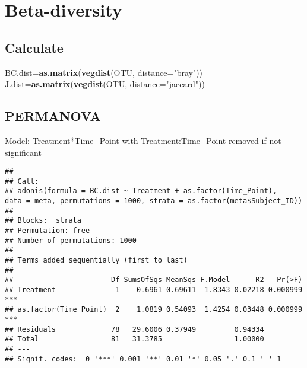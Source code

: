 \documentclass[]{article}
\newenvironment{Shaded}{\begin{snugshade}}{\end{snugshade}}
\newcommand{\KeywordTok}[1]{\textcolor[rgb]{0.13,0.29,0.53}{\textbf{#1}}}
\newcommand{\DataTypeTok}[1]{\textcolor[rgb]{0.13,0.29,0.53}{#1}}
\newcommand{\DecValTok}[1]{\textcolor[rgb]{0.00,0.00,0.81}{#1}}
\newcommand{\StringTok}[1]{\textcolor[rgb]{0.31,0.60,0.02}{#1}}
\newcommand{\OperatorTok}[1]{\textcolor[rgb]{0.81,0.36,0.00}{\textbf{#1}}}
\newcommand{\NormalTok}[1]{#1}
\begin{document}
\section{Beta-diversity}\label{beta-diversity}

\subsection{Calculate}\label{calculate}

\begin{Shaded}
\begin{Highlighting}[]
\NormalTok{BC.dist=}\KeywordTok{as.matrix}\NormalTok{(}\KeywordTok{vegdist}\NormalTok{(OTU, }\DataTypeTok{distance=}\StringTok{"bray"}\NormalTok{))}
\NormalTok{J.dist=}\KeywordTok{as.matrix}\NormalTok{(}\KeywordTok{vegdist}\NormalTok{(OTU, }\DataTypeTok{distance=}\StringTok{"jaccard"}\NormalTok{))}
\end{Highlighting}
\end{Shaded}

\subsection{PERMANOVA}\label{permanova}

Model: Treatment*Time\_Point with Treatment:Time\_Point removed if not
significant

\begin{Shaded}
\end{Shaded}

\begin{verbatim}
## 
## Call:
## adonis(formula = BC.dist ~ Treatment + as.factor(Time_Point),      data = meta, permutations = 1000, strata = as.factor(meta$Subject_ID)) 
## 
## Blocks:  strata 
## Permutation: free
## Number of permutations: 1000
## 
## Terms added sequentially (first to last)
## 
##                       Df SumsOfSqs MeanSqs F.Model      R2   Pr(>F)    
## Treatment              1    0.6961 0.69611  1.8343 0.02218 0.000999 ***
## as.factor(Time_Point)  2    1.0819 0.54093  1.4254 0.03448 0.000999 ***
## Residuals             78   29.6006 0.37949         0.94334             
## Total                 81   31.3785                 1.00000             
## ---
## Signif. codes:  0 '***' 0.001 '**' 0.01 '*' 0.05 '.' 0.1 ' ' 1
\end{verbatim}
\end{document}
